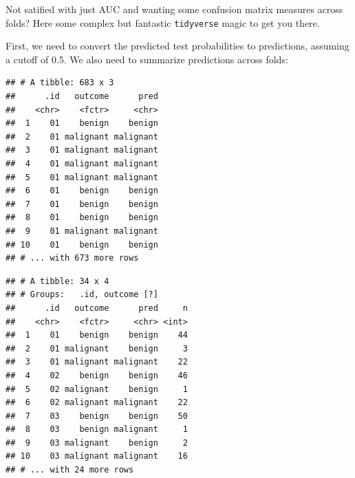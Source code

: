 \documentclass[]{article}
\newenvironment{Shaded}{\begin{snugshade}}{\end{snugshade}}
\newcommand{\KeywordTok}[1]{\textcolor[rgb]{0.13,0.29,0.53}{\textbf{#1}}}
\newcommand{\DataTypeTok}[1]{\textcolor[rgb]{0.13,0.29,0.53}{#1}}
\newcommand{\FloatTok}[1]{\textcolor[rgb]{0.00,0.00,0.81}{#1}}
\newcommand{\StringTok}[1]{\textcolor[rgb]{0.31,0.60,0.02}{#1}}
\newcommand{\OperatorTok}[1]{\textcolor[rgb]{0.81,0.36,0.00}{\textbf{#1}}}
\newcommand{\NormalTok}[1]{#1}
\begin{document}
Not satified with just AUC and wanting some confusion matrix measures
across folds? Here some complex but fantastic \texttt{tidyverse} magic
to get you there.

First, we need to convert the predicted test probabilities to
predictions, assuming a cutoff of 0.5. We also need to summarize
predictions across folds:

\begin{Shaded}
\end{Shaded}

\begin{verbatim}
## # A tibble: 683 x 3
##      .id   outcome      pred
##    <chr>    <fctr>     <chr>
##  1    01    benign    benign
##  2    01 malignant malignant
##  3    01 malignant malignant
##  4    01 malignant malignant
##  5    01 malignant malignant
##  6    01    benign    benign
##  7    01    benign    benign
##  8    01    benign    benign
##  9    01 malignant malignant
## 10    01    benign    benign
## # ... with 673 more rows
\end{verbatim}

\begin{Shaded}
\end{Shaded}

\begin{verbatim}
## # A tibble: 34 x 4
## # Groups:   .id, outcome [?]
##      .id   outcome      pred     n
##    <chr>    <fctr>     <chr> <int>
##  1    01    benign    benign    44
##  2    01 malignant    benign     3
##  3    01 malignant malignant    22
##  4    02    benign    benign    46
##  5    02 malignant    benign     1
##  6    02 malignant malignant    22
##  7    03    benign    benign    50
##  8    03    benign malignant     1
##  9    03 malignant    benign     2
## 10    03 malignant malignant    16
## # ... with 24 more rows
\end{verbatim}
\end{document}
